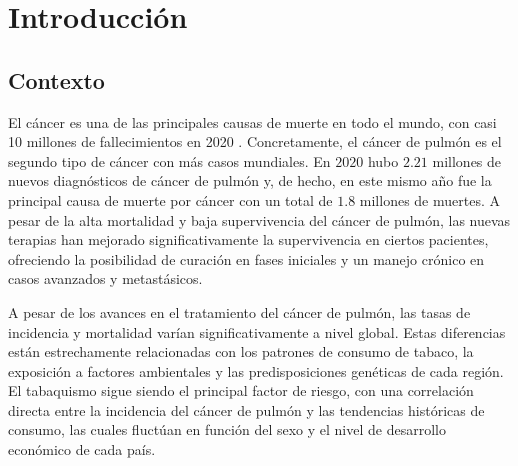 %


\chapter{Introducción}

\section{Contexto}

El cáncer es una de las principales causas de muerte en todo el mundo, con casi 10 millones de fallecimientos en 2020 \parencite{whoCancer}. Concretamente, el cáncer de pulmón es el segundo tipo de cáncer con más casos mundiales. En $2020$ hubo $2.21$ millones de nuevos diagnósticos de cáncer de pulmón y, de hecho, en este mismo año fue la principal causa de muerte por cáncer con un total de $1.8$ millones de muertes. A pesar de la alta mortalidad y baja supervivencia del cáncer de pulmón, las nuevas terapias han mejorado significativamente la supervivencia en ciertos pacientes, ofreciendo la posibilidad de curación en fases iniciales y un manejo crónico en casos avanzados y metastásicos. \parencite{schabath2019cancer}

A pesar de los avances en el tratamiento del cáncer de pulmón, las tasas de incidencia y mortalidad varían significativamente a nivel global. Estas diferencias están estrechamente relacionadas con los patrones de consumo de tabaco, la exposición a factores ambientales y las predisposiciones genéticas de cada región. El tabaquismo sigue siendo el principal factor de riesgo, con una correlación directa entre la incidencia del cáncer de pulmón y las tendencias históricas de consumo, las cuales fluctúan en función del sexo y el nivel de desarrollo económico de cada país. \parencite{leiter2023global}

